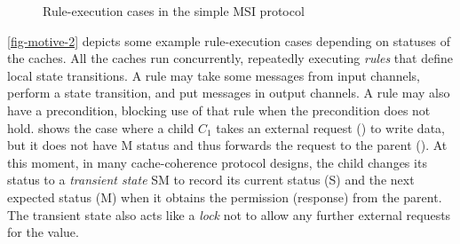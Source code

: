 \documentclass[sigplan,10pt,review,anonymous,screen]{acmart}\settopmatter{printfolios=true,printccs=false,printacmref=false}
\begin{document}
\newcommand{\blackdiamond}{\raisebox{.4ex}{\ensuremath{\scriptscriptstyle\blacklozenge}}}

\begin{figure}[h]
  \centering
  \caption{Rule-execution cases in the simple MSI protocol}
  \vspace{-5pt}
  \label{fig-motive-2}
\end{figure}

\autoref{fig-motive-2} depicts some example rule-execution cases depending on statuses of the caches.
All the caches run concurrently, repeatedly executing \emph{rules} that define local state transitions.
A rule may take some messages from input channels, perform a state transition, and put messages in output channels.
A rule may also have a precondition, blocking use of that rule when the precondition does not hold.
 shows the case where a child $C_1$ takes an external request () to write data, but it does not have M status and thus forwards the request to the parent ().
At this moment, in many cache-coherence protocol designs, the child changes its status to a \emph{transient state} SM to record its current status (S) and the next expected status (M) when it obtains the permission (response) from the parent.
The transient state also acts like a \emph{lock} not to allow any further external requests for the value.
\end{document}
